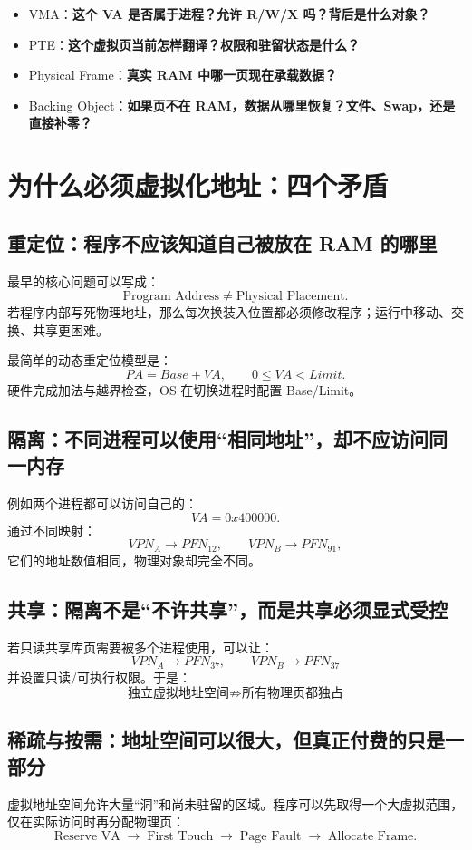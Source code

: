\documentclass[11pt,a4paper]{ctexart}
\newcommand{\kw}[1]{\textbf{#1}}
\newcommand{\arr}{\;\longrightarrow\;}
\begin{document}
\begin{statebox}[每层回答不同问题]
\begin{itemize}
  \item VMA：\kw{这个 VA 是否属于进程？允许 R/W/X 吗？背后是什么对象？}
  \item PTE：\kw{这个虚拟页当前怎样翻译？权限和驻留状态是什么？}
  \item Physical Frame：\kw{真实 RAM 中哪一页现在承载数据？}
  \item Backing Object：\kw{如果页不在 RAM，数据从哪里恢复？文件、Swap，还是直接补零？}
\end{itemize}
\end{statebox}

\section{为什么必须虚拟化地址：四个矛盾}

\subsection{重定位：程序不应该知道自己被放在 RAM 的哪里}
最早的核心问题可以写成：
\[
\text{Program Address} \neq \text{Physical Placement}.
\]
若程序内部写死物理地址，那么每次换装入位置都必须修改程序；运行中移动、交换、共享更困难。

最简单的动态重定位模型是：
\[
PA = Base + VA, \qquad 0\le VA<Limit.
\]
硬件完成加法与越界检查，OS 在切换进程时配置 Base/Limit。

\subsection{隔离：不同进程可以使用“相同地址”，却不应访问同一内存}
例如两个进程都可以访问自己的：
\[
VA=0x400000.
\]
通过不同映射：
\[
VPN_A\to PFN_{12},\qquad VPN_B\to PFN_{91},
\]
它们的地址数值相同，物理对象却完全不同。

\subsection{共享：隔离不是“不许共享”，而是共享必须显式受控}
若只读共享库页需要被多个进程使用，可以让：
\[
VPN_A\to PFN_{37},\qquad VPN_B\to PFN_{37}
\]
并设置只读/可执行权限。于是：
\[
\boxed{\text{独立虚拟地址空间} \not\Rightarrow \text{所有物理页都独占}}
\]

\subsection{稀疏与按需：地址空间可以很大，但真正付费的只是一部分}
虚拟地址空间允许大量“洞”和尚未驻留的区域。程序可以先取得一个大虚拟范围，仅在实际访问时再分配物理页：
\[
\text{Reserve VA} \arr \text{First Touch} \arr \text{Page Fault} \arr \text{Allocate Frame}.
\]
\end{document}
